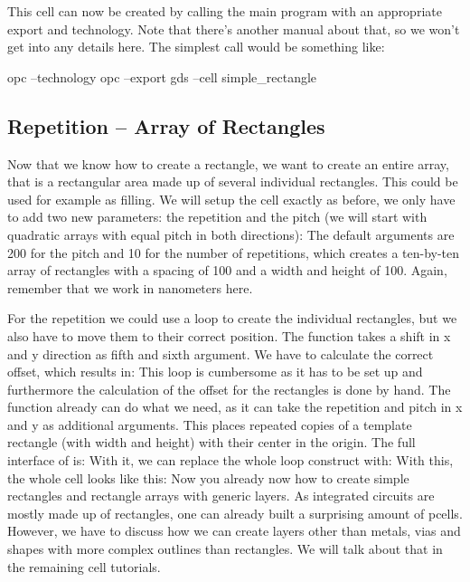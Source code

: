 This cell can now be created by calling the main program with an appropriate export and technology.
Note that there's another manual about that, so we won't get into any details here.
The simplest call would be something like:
\begin{shellcode}
    opc --technology opc --export gds --cell simple_rectangle
\end{shellcode}

\subsection{Repetition -- Array of Rectangles}
Now that we know how to create a rectangle, we want to create an entire array, that is a rectangular area made up of several individual rectangles. This could be
used for example as filling. We will setup the cell exactly as before, we only have to add two new parameters: the repetition and the pitch (we will start with
quadratic arrays with equal pitch in both directions):
The default arguments are \num{200} for the pitch and \num{10} for the number of repetitions, which creates a ten-by-ten array of rectangles with a spacing of
\num{100} and a width and height of \num{100}. Again, remember that we work in nanometers here.

For the repetition we could use a loop to create the individual rectangles, but we also have to move them to their correct position.
The  function takes a shift in x and y direction as fifth and sixth argument.
We have to calculate the correct offset, which results in:
This loop is cumbersome as it has to be set up and furthermore the calculation of the offset for the rectangles is done by hand.
The function  already can do what we need, as it can take the repetition and pitch in x and y as additional arguments.
This places repeated copies of a template rectangle (with width and height) with their center in the origin.
The full interface of  is:
With it, we can replace the whole loop construct with:
With this, the whole cell looks like this:
Now you already now how to create simple rectangles and rectangle arrays with generic layers.
As integrated circuits are mostly made up of rectangles, one can already built a surprising amount of pcells.
However, we have to discuss how we can create layers other than metals, vias and shapes with more complex outlines than rectangles.
We will talk about that in the remaining cell tutorials.

